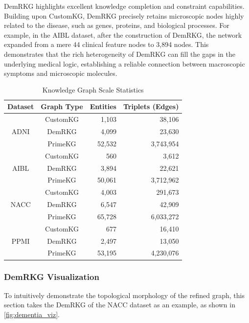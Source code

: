 \documentclass[lettersize,journal]{IEEEtran}
\begin{document}
DemRKG highlights excellent knowledge completion and constraint capabilities. Building upon CustomKG, DemRKG precisely retains microscopic nodes highly related to the disease, such as genes, proteins, and biological processes. For example, in the AIBL dataset, after the construction of DemRKG, the network expanded from a mere 44 clinical feature nodes to 3,894 nodes. This demonstrates that the rich heterogeneity of DemRKG can fill the gaps in the underlying medical logic, establishing a reliable connection between macroscopic symptoms and microscopic molecules.
\begin{table}[!t]
\centering
\caption{Knowledge Graph Scale Statistics}
\label{tab:kg_statistics}
\setlength{\tabcolsep}{8pt}
\renewcommand{\arraystretch}{1.15}
\begin{tabular}{c c r r}
\hline
\textbf{Dataset} & \textbf{Graph Type} & \textbf{Entities} & \textbf{Triplets (Edges)} \\
\hline
\multirow{3}{*}{ADNI} & CustomKG & 1,103  & 38,106 \\
                    & DemRKG   & 4,099  & 23,630 \\
                    & PrimeKG  & 52,532 & 3,743,954 \\
\hline
\multirow{3}{*}{AIBL} & CustomKG & 560    & 3,612 \\
                    & DemRKG   & 3,894  & 22,621 \\
                    & PrimeKG  & 50,061 & 3,712,962 \\
\hline
\multirow{3}{*}{NACC} & CustomKG & 4,003  & 291,673 \\
                    & DemRKG   & 6,547  & 42,909 \\
                    & PrimeKG  & 65,728 & 6,033,272 \\
\hline
\multirow{3}{*}{PPMI} & CustomKG & 677    & 16,410 \\
                    & DemRKG   & 2,497  & 13,050 \\
                    & PrimeKG  & 53,195 & 4,230,076 \\
\hline
\end{tabular}
\end{table}

\subsubsection{DemRKG Visualization}
To intuitively demonstrate the topological morphology of the refined graph, this section takes the DemRKG of the NACC dataset as an example, as shown in \cref{fig:dementia_viz}.
\end{document}
